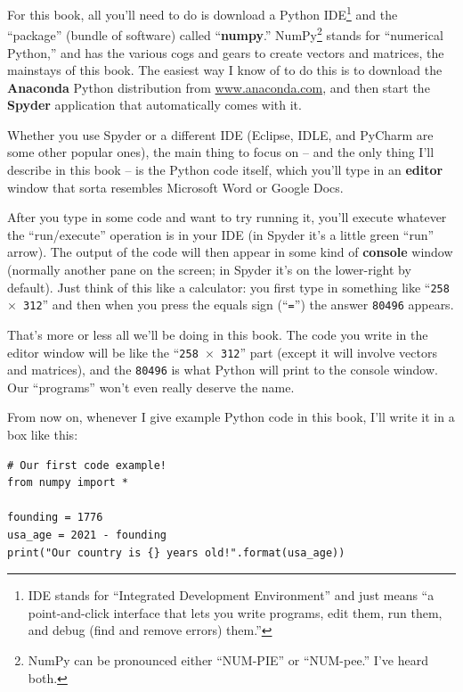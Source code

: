 For this book, all you'll need to do is download a Python IDE\footnote{IDE
stands for ``Integrated Development Environment'' and just means ``a
point-and-click interface that lets you write programs, edit them, run them,
and debug (find and remove errors) them.''} and the ``package'' (bundle of
software) called ``\textbf{numpy}.'' NumPy\footnote{NumPy can be pronounced
either ``NUM-PIE'' or ``NUM-pee.'' I've heard both.} stands for ``numerical
Python,'' and has the various cogs and gears to create vectors and matrices,
the mainstays of this book. The easiest way I know of to do this is to download
the \textbf{Anaconda} Python distribution from \url{www.anaconda.com}, and then
start the \textbf{Spyder} application that automatically comes with it.

Whether you use Spyder or a different IDE (Eclipse, IDLE, and PyCharm are some
other popular ones), the main thing to focus on -- and the only thing I'll
describe in this book -- is the Python code itself, which you'll type in an
\textbf{editor} window that sorta resembles Microsoft Word or Google Docs.

After you type in some code and want to try running it, you'll execute whatever
the ``run/execute'' operation is in your IDE (in Spyder it's a little green
``run'' arrow). The output of the code will then appear in some kind of
\textbf{console} window (normally another pane on the screen; in Spyder it's on
the lower-right by default). Just think of this like a calculator: you first
type in something like ``\texttt{258 $\times$ 312}'' and then when you press
the equals sign (``\texttt{=}'') the answer \texttt{80496} appears.

That's more or less all we'll be doing in this book. The code you write in the
editor window will be like the ``\texttt{258 $\times$ 312}'' part (except it
will involve vectors and matrices), and the \texttt{80496} is what Python will
print to the console window. Our ``programs'' won't even really deserve the
name.

From now on, whenever I give example Python code in this book, I'll write it in
a box like this:


\label{firstPython}

\vspace{-.15in}
\begin{Verbatim}[fontsize=\small,samepage=true,frame=single,framesep=3mm]
# Our first code example!
from numpy import *

founding = 1776
usa_age = 2021 - founding
print("Our country is {} years old!".format(usa_age))
\end{Verbatim}
\vspace{-.15in}

